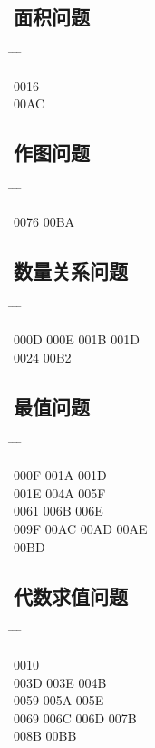 \documentclass[twoside, twocolumn]{ctexart}
\newenvironment{problist}{
  \begin{center} \ttfamily \begin{tabbing}
      \hspace{50pt} \= \hspace{50pt} \= \hspace{50pt} \= \kill
  }{ \end{tabbing} \end{center} }
\begin{document}
  \subsection*{面积问题}

  \begin{problist}
    0016    \\ 00AC \\
  \end{problist}

  \subsection*{作图问题}

  \begin{problist}
    0076 \> 00BA \\
  \end{problist}

  \subsection*{数量关系问题}

  \begin{problist}
    000D \> 000E \> 001B \> 001D \\ 0024  \> 00B2 \\
  \end{problist}

  \subsection*{最值问题}

  \begin{problist}
    000F  \> 001A \> 001D \\ 001E \> 004A \> 005F  \\
    0061  \> 006B \> 006E \\ 009F \> 00AC \> 00AD \> 00AE \\
    00BD \\
  \end{problist}

  \subsection*{代数求值问题}

  \begin{problist}
    0010    \\ 003D \> 003E \> 004B  \\
    0059 \> 005A \> 005E  \\ 0069 \> 006C \> 006D \> 007B \\
    008B \> 00BB \\
  \end{problist}
\end{document}
